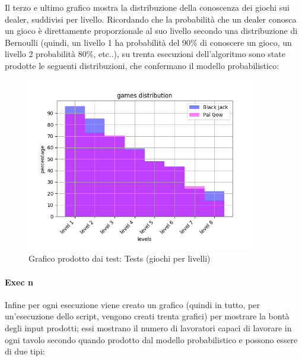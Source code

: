     \FloatBarrier
    \noindent
    Il terzo e ultimo grafico mostra la distribuzione della conoscenza dei giochi sui dealer, suddivisi per livello. Ricordando che la probabilità che un dealer conosca un gioco è direttamente proporzionale al suo livello secondo una distribuzione di Bernoulli (quindi, un livello 1 ha probabilità del 90\% di conoscere un gioco, un livello 2 probabilità 80\%, etc..), su trenta esecuzioni dell’algoritmo sono state prodotte le seguenti distribuzioni, che confermano il modello probabilistico:
    \begin{figure}[!h]
        \centering
        \includegraphics[width=0.9\textwidth,keepaspectratio]{../immagini/distr_games.png}
        \caption{Grafico prodotto dai test: Tests (giochi per livelli)}
    \end{figure}
    \FloatBarrier
    \noindent
    
    \paragraph{Exec n} Infine per ogni esecuzione viene creato un grafico (quindi in tutto, per un'esecuzione dello script, vengono creati trenta grafici) per mostrare la bontà degli input prodotti; essi mostrano il numero di lavoratori capaci di lavorare in ogni tavolo secondo quando prodotto dal modello probabilistico e possono essere di due tipi:
    
